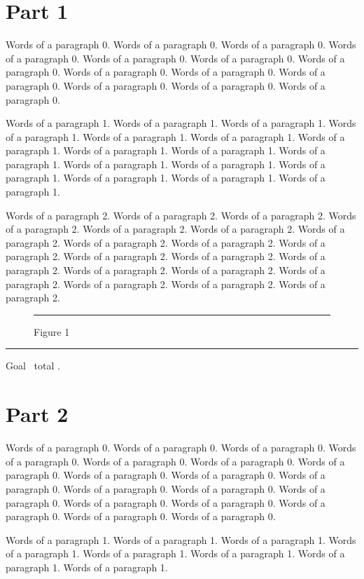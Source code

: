 \documentclass{article}
\begin{document}
\section{Part 1}
Words of a paragraph 0. Words of a paragraph 0. Words of a paragraph 0. Words of a paragraph 0. Words of a paragraph 0. Words of a paragraph 0. Words of a paragraph 0. Words of a paragraph 0. Words of a paragraph 0. Words of a paragraph 0. Words of a paragraph 0. Words of a paragraph 0. Words of a paragraph 0. 

Words of a paragraph 1. Words of a paragraph 1. Words of a paragraph 1. Words of a paragraph 1. Words of a paragraph 1. Words of a paragraph 1. Words of a paragraph 1. Words of a paragraph 1. Words of a paragraph 1. Words of a paragraph 1. Words of a paragraph 1. Words of a paragraph 1. Words of a paragraph 1. Words of a paragraph 1. Words of a paragraph 1. Words of a paragraph 1. 

Words of a paragraph 2. Words of a paragraph 2. Words of a paragraph 2. Words of a paragraph 2. Words of a paragraph 2. Words of a paragraph 2. Words of a paragraph 2. Words of a paragraph 2. Words of a paragraph 2. Words of a paragraph 2. Words of a paragraph 2. Words of a paragraph 2. Words of a paragraph 2. Words of a paragraph 2. Words of a paragraph 2. Words of a paragraph 2. Words of a paragraph 2. Words of a paragraph 2. Words of a paragraph 2. 

\begin{figure}[tp]\centering\rule{120pt}{97pt}\caption{Figure 1}\end{figure}
\noindent\rule{\linewidth}{0.4pt}\par Goal \the\pagegoal\ total \the\pagetotal.

\section{Part 2}
Words of a paragraph 0. Words of a paragraph 0. Words of a paragraph 0. Words of a paragraph 0. Words of a paragraph 0. Words of a paragraph 0. Words of a paragraph 0. Words of a paragraph 0. Words of a paragraph 0. Words of a paragraph 0. Words of a paragraph 0. Words of a paragraph 0. Words of a paragraph 0. Words of a paragraph 0. Words of a paragraph 0. Words of a paragraph 0. Words of a paragraph 0. Words of a paragraph 0. 

Words of a paragraph 1. Words of a paragraph 1. Words of a paragraph 1. Words of a paragraph 1. Words of a paragraph 1. Words of a paragraph 1. Words of a paragraph 1. Words of a paragraph 1. 
\end{document}
